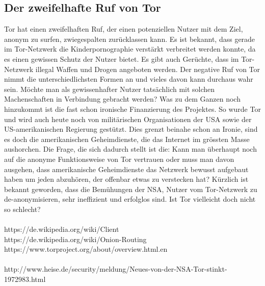 \subsection{Der zweifelhafte Ruf von Tor}
Tor hat einen zweifelhaften Ruf, der einen potenziellen Nutzer mit dem Ziel, anonym zu surfen, zwiegespalten zurücklassen kann. Es ist bekannt, dass gerade im Tor-Netzwerk die Kinderpornographie verstärkt verbreitet werden konnte, da es einen gewissen Schutz der Nutzer bietet. Es gibt auch Gerüchte, dass im Tor-Netzwerk illegal Waffen und Drogen angeboten werden. Der negative Ruf von Tor nimmt die unterschiedlichsten Formen an und vieles davon kann durchaus wahr sein. Möchte man als gewissenhafter Nutzer tatsächlich mit solchen Machenschaften in Verbindung gebracht werden? Was zu dem Ganzen noch hinzukommt ist die fast schon ironische Finanzierung des Projektes. So wurde Tor und wird auch heute noch von militärischen Organisationen der USA sowie der US-amerikanischen Regierung  gestützt. Dies grenzt beinahe schon an Ironie, sind es doch die amerikanischen Geheimdienste, die das Internet im grössten Masse aushorchen. Die Frage, die sich dadurch stellt ist die: Kann man überhaupt noch auf die anonyme Funktionsweise von Tor vertrauen oder muss man davon ausgehen, dass amerikanische Geheimdienste das Netzwerk bewusst aufgebaut haben um jeden abzuhören, der offenbar etwas zu verstecken hat? Kürzlich ist bekannt geworden, dass die Bemühungen der NSA, Nutzer vom Tor-Netzwerk zu de-anonymisieren, sehr ineffizient und erfolglos sind. Ist Tor vielleicht doch nicht so schlecht?
\\%
\\https://de.wikipedia.org/wiki/Client
\\https://de.wikipedia.org/wiki/Onion-Routing
\\https://www.torproject.org/about/overview.html.en
\\%
\\http://www.heise.de/security/meldung/Neues-von-der-NSA-Tor-stinkt-1972983.html
